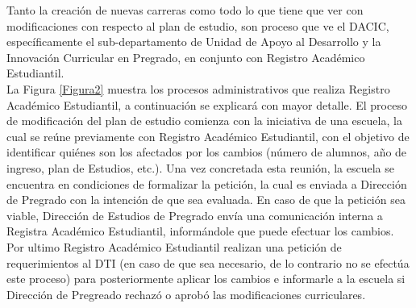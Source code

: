 		Tanto la creación de nuevas carreras como todo lo que tiene que ver con modificaciones con respecto al plan de estudio, son proceso que ve el DACIC, específicamente el sub-departamento de Unidad de Apoyo al Desarrollo y la Innovación Curricular en Pregrado, en conjunto con Registro Académico Estudiantil.
		\\
		
		La Figura \ref{Figura2} muestra los procesos administrativos que realiza Registro Académico Estudiantil, a continuación se explicará con mayor detalle.
		El proceso de modificación del plan de estudio comienza con la iniciativa de una escuela, la cual se reúne previamente con Registro Académico Estudiantil, con el objetivo  de identificar quiénes son los afectados por los cambios (número de alumnos, año de ingreso, plan de Estudios, etc.). Una vez concretada esta reunión, la escuela se encuentra en condiciones de formalizar la petición, la cual es enviada a Dirección de Pregrado con la intención de que sea evaluada. En caso de que la petición sea viable, Dirección de Estudios de Pregrado envía una comunicación interna a Registra Académico Estudiantil, informándole que puede efectuar los cambios.
		\\
		
		Por ultimo Registro Académico Estudiantil realizan una petición de requerimientos al DTI (en caso de que sea necesario, de lo contrario no se efectúa este proceso) para posteriormente aplicar los cambios e informarle a la escuela si Dirección de Pregreado rechazó o aprobó las modificaciones curriculares.
		
